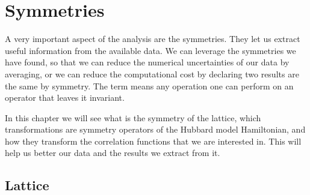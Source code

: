 
\chapter{Symmetries}
\label{sec:symmetries}

A very important aspect of the analysis are the symmetries. They let us extract useful information from the available data. We can leverage the symmetries we have found, so that we can reduce the numerical uncertainties of our data by averaging, or we can reduce the computational cost by declaring two results are the same by symmetry. The term means any operation one can perform on an operator that leaves it invariant.

In this chapter we will see what is the symmetry of the lattice, which transformations are symmetry operators of the Hubbard model Hamiltonian, and how they transform the correlation functions that we are interested in. This will help us better our data and the results we extract from it.

\section{Lattice}

